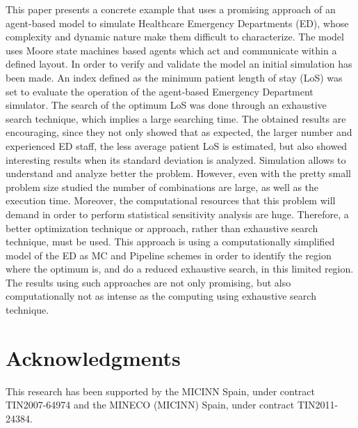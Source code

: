 \documentclass[11pt]{article} %
\begin{document}
This paper presents a concrete example that uses a promising approach of an agent-based model to simulate Healthcare Emergency 
Departments (ED), whose complexity and dynamic nature make them difficult to characterize.  The model uses Moore state machines 
based agents which act and communicate within a defined layout. In order to verify and validate the model an initial simulation has 
been made. 
An index defined as the minimum patient length of stay (LoS) was set to evaluate the operation of the agent-based Emergency 
Department simulator. The search of the optimum LoS was done through an exhaustive search technique, which implies a large 
searching time. The obtained results are encouraging, since they not only showed that as expected, the larger number and 
experienced ED staff, the less average patient LoS is estimated, but also showed interesting results when its standard deviation is 
analyzed. Simulation allows to understand and analyze better the problem. However, even with the pretty small problem size studied 
the number of combinations are large, as well as the execution time. Moreover, the computational resources that this problem will 
demand in order to perform statistical sensitivity analysis are huge. Therefore, a better optimization technique or approach, rather than exhaustive search technique, must be used. This approach is using a computationally simplified model of the ED as MC and Pipeline schemes in order to identify the region where the optimum is, and do a reduced exhaustive search, in this limited region. The results using such approaches are not only promising, but also computationally not as intense as the computing using exhaustive search technique. 


\section*{Acknowledgments}
This research has been supported by the MICINN Spain, under contract TIN2007-64974 and the MINECO (MICINN) Spain, under contract TIN2011-24384.
 


\end{document}
